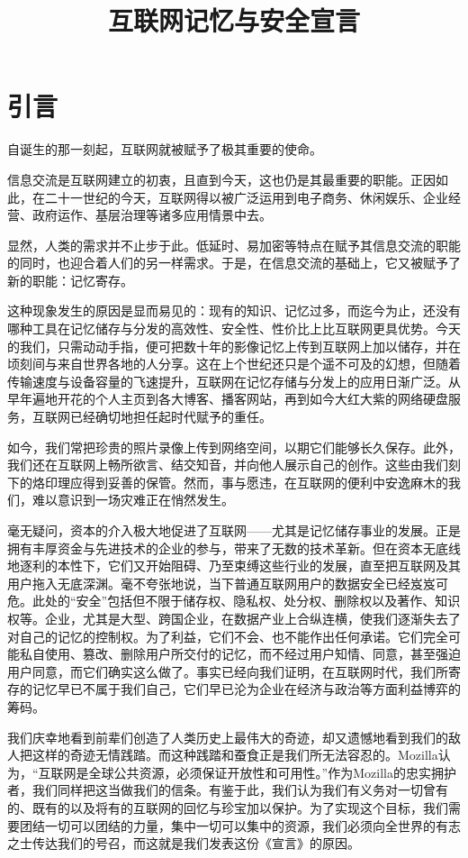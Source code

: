 \documentclass[a4paper,12pt]{ctexart}
\title{互联网记忆与安全宣言}
\date{}
\begin{document}
	\maketitle
	\section*{引言}
	自诞生的那一刻起，互联网就被赋予了极其重要的使命。
	
	信息交流是互联网建立的初衷，且直到今天，这也仍是其最重要的职能。正因如此，在二十一世纪的今天，互联网得以被广泛运用到电子商务、休闲娱乐、企业经营、政府运作、基层治理等诸多应用情景中去。
	
	显然，人类的需求并不止步于此。低延时、易加密等特点在赋予其信息交流的职能的同时，也迎合着人们的另一样需求。于是，在信息交流的基础上，它又被赋予了新的职能：记忆寄存。
	
	这种现象发生的原因是显而易见的：现有的知识、记忆过多，而迄今为止，还没有哪种工具在记忆储存与分发的高效性、安全性、性价比上比互联网更具优势。今天的我们，只需动动手指，便可把数十年的影像记忆上传到互联网上加以储存，并在顷刻间与来自世界各地的人分享。这在上个世纪还只是个遥不可及的幻想，但随着传输速度与设备容量的飞速提升，互联网在记忆存储与分发上的应用日渐广泛。从早年遍地开花的个人主页到各大博客、播客网站，再到如今大红大紫的网络硬盘服务，互联网已经确切地担任起时代赋予的重任。
	
	如今，我们常把珍贵的照片录像上传到网络空间，以期它们能够长久保存。此外，我们还在互联网上畅所欲言、结交知音，并向他人展示自己的创作。这些由我们刻下的烙印理应得到妥善的保管。然而，事与愿违，在互联网的便利中安逸麻木的我们，难以意识到一场灾难正在悄然发生。
	
	毫无疑问，资本的介入极大地促进了互联网——尤其是记忆储存事业的发展。正是拥有丰厚资金与先进技术的企业的参与，带来了无数的技术革新。但在资本无底线地逐利的本性下，它们又开始阻碍、乃至束缚这些行业的发展，直至把互联网及其用户拖入无底深渊。毫不夸张地说，当下普通互联网用户的数据安全已经岌岌可危。此处的“安全”包括但不限于储存权、隐私权、处分权、删除权以及著作、知识权等。企业，尤其是大型、跨国企业，在数据产业上合纵连横，使我们逐渐失去了对自己的记忆的控制权。为了利益，它们不会、也不能作出任何承诺。它们完全可能私自使用、篡改、删除用户所交付的记忆，而不经过用户知情、同意，甚至强迫用户同意，而它们确实这么做了。事实已经向我们证明，在互联网时代，我们所寄存的记忆早已不属于我们自己，它们早已沦为企业在经济与政治等方面利益博弈的筹码。
	
	我们庆幸地看到前辈们创造了人类历史上最伟大的奇迹，却又遗憾地看到我们的敌人把这样的奇迹无情践踏。而这种践踏和蚕食正是我们所无法容忍的。Mozilla认为，“互联网是全球公共资源，必须保证开放性和可用性。”作为Mozilla的忠实拥护者，我们同样把这当做我们的信条。有鉴于此，我们认为我们有义务对一切曾有的、既有的以及将有的互联网的回忆与珍宝加以保护。为了实现这个目标，我们需要团结一切可以团结的力量，集中一切可以集中的资源，我们必须向全世界的有志之士传达我们的号召，而这就是我们发表这份《宣言》的原因。
	
\end{document}
